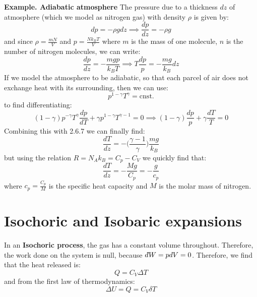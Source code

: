 \documentclass[a4paper,11pt,oneside]{book}
\newcommand{\dbar}{d\hspace*{-0.08em}\bar{}\hspace*{0.1em}}
\begin{document}
\begin{mdframed}
\textbf{Example. Adiabatic atmosphere}
The pressure due to a thickness $dz$ of atmosphere (which we model as nitrogen gas) with density $\rho$ is given by:
\begin{equation}
    dp = - \rho g dz \implies \frac{dp}{dz}=-\rho g
\end{equation}
and since $\rho = \frac{m N}{V}$ and $p=\frac{Nk_BT}{V}$ where $m$ is the mass of one molecule, $n$ is the number of nitrogen molecules, we can write:
\begin{equation}
    \frac{dp}{dz}=-\frac{mgp}{k_B T} \implies T \frac{dp}{p} = -\frac{mg}{k_B}dz
\end{equation}
If we model the atmosphere to be adiabatic, so that each parcel of air does not exchange heat with its surrounding, then we can use:
\begin{equation}
    p^{1-\gamma}T^{\gamma}=\text{cnst.}
\end{equation}
to find differentiating:
\begin{equation}
    (1-\gamma)p^{-\gamma}T^\gamma \frac{dp}{dT} + \gamma p^{1-\gamma}T^{\gamma-1} = 0 \implies (1-\gamma)\frac{dp}{p}+\gamma \frac{dT}{T}=0
\end{equation}
Combining this with 2.6.7 we can finally find:
\begin{equation}
\frac{dT}{dz}=-\Big(\frac{\gamma-1}{\gamma}\Big)\frac{mg}{k_B}    
\end{equation}
but using the relation $R=N_A k_B = C_p-C_V$ we quickly find that:
\begin{equation}
    \frac{dT}{dz}=-\frac{Mg}{C_p}=-\frac{g}{c_p}
\end{equation}
where $c_p=\frac{C_p}{M}$ is the specific heat capacity and $M$ is the molar mass of nitrogen. 
\end{mdframed}
\section{Isochoric and Isobaric expansions}
In an \textbf{Isochoric process}, the gas has a constant volume throughout. Therefore, the work done on the system is null, because $\dbar W = p dV = 0$. Therefore, we find that the heat released is:
\begin{equation}
    Q = C_V \Delta T
\end{equation}
and from the first law of thermodynamics:
\begin{equation}
\Delta U = Q = C_V \delta T
\end{equation}
\end{document}
